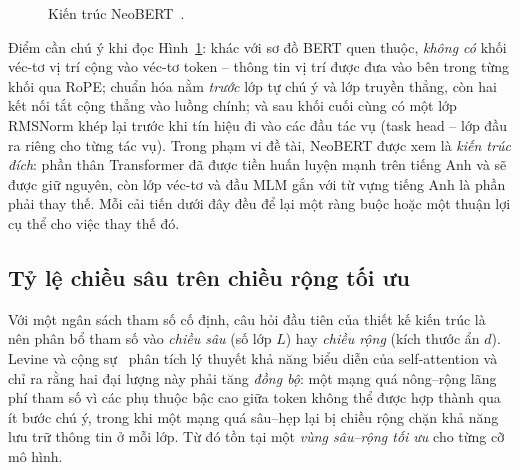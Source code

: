 \begin{figure}[!htbp]
{%
  }
  \caption{Kiến trúc NeoBERT~\cite{lebreton2025neobert}.}
  \label{fig:neobert-arch}
\end{figure}

Điểm cần chú ý khi đọc Hình~\ref{fig:neobert-arch}: khác
với sơ đồ BERT quen thuộc,
\textit{không có} khối véc-tơ vị trí cộng vào véc-tơ token -- thông tin vị trí được đưa
vào bên trong từng khối qua RoPE; chuẩn hóa nằm \textit{trước} lớp tự chú ý và lớp
truyền thẳng, còn hai kết nối tắt cộng thẳng vào luồng chính; và sau khối cuối cùng có
một lớp RMSNorm khép lại trước khi tín hiệu đi vào các đầu tác vụ (task head -- lớp đầu ra
riêng cho từng tác vụ). Trong phạm vi đề tài,
NeoBERT được xem là \textit{kiến trúc đích}: phần thân Transformer đã được tiền huấn
luyện mạnh trên tiếng Anh và sẽ được giữ nguyên, còn lớp véc-tơ và đầu MLM gắn với từ vựng
tiếng Anh là phần phải thay thế. Mỗi cải tiến dưới đây đều để lại một ràng buộc hoặc một
thuận lợi cụ thể cho việc thay thế đó.

\subsection{Tỷ lệ chiều sâu trên chiều rộng tối ưu}
\label{subsec:depth-width}

Với một ngân sách tham số cố định, câu hỏi đầu tiên của thiết kế kiến trúc là nên phân bổ
tham số vào \textit{chiều sâu} (số lớp $L$) hay \textit{chiều rộng} (kích thước ẩn $d$).
Levine và cộng sự~\cite{levine2020limits} phân tích lý thuyết khả năng biểu diễn của
self-attention và chỉ ra rằng hai đại lượng này phải tăng \textit{đồng bộ}: một mạng quá
nông--rộng lãng phí tham số vì các phụ thuộc bậc cao giữa token không thể được hợp thành
qua ít bước chú ý, trong khi một mạng quá sâu--hẹp lại bị chiều rộng chặn khả năng lưu trữ
thông tin ở mỗi lớp. Từ đó tồn tại một \textit{vùng sâu--rộng tối ưu} cho từng cỡ mô hình.


